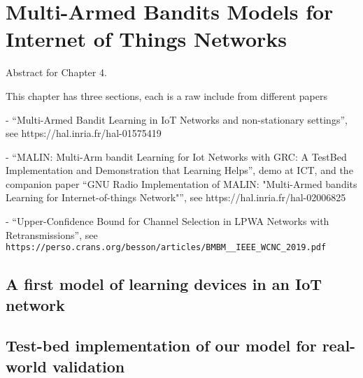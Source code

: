 
\chapter{Multi-Armed Bandits Models for Internet of Things Networks}
\label{chapter:4}
\minitoc

Abstract for Chapter 4.

\newpage
\graphicspath{{2-Chapters/4-Chapter/Images/}}




This chapter has three sections, each is a raw include from different papers

- ``Multi-Armed Bandit Learning in IoT Networks and non-stationary settings'', see https://hal.inria.fr/hal-01575419

- ``MALIN: Multi-Arm bandit Learning for Iot Networks with GRC: A TestBed Implementation and Demonstration that Learning Helps'', demo at ICT, and the companion paper ``GNU Radio Implementation of MALIN: "Multi-Armed bandits Learning for Internet-of-things Network"'', see https://hal.inria.fr/hal-02006825

- ``Upper-Confidence Bound for Channel Selection in LPWA Networks with Retransmissions'', see \texttt{https://perso.crans.org/besson/articles/BMBM\_\_IEEE\_WCNC\_2019.pdf}


\section{A first model of learning devices in an IoT network}
\label{sec:4:firstModel}





\section{Test-bed implementation of our model for real-world validation}
\label{sec:4:gnuradio}

